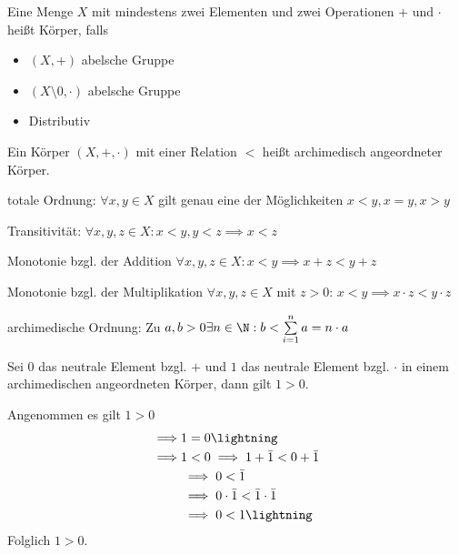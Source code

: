 \begin{definition}
	Eine Menge $X$ mit mindestens zwei Elementen und zwei Operationen $+$ und $\cdot$ heißt Körper, falls \begin{itemize}
		\item $(X,+)$ abelsche Gruppe
		\item $(X\setminus 0, \cdot)$ abelsche Gruppe
		\item Distributiv
	\end{itemize}
\end{definition}
\begin{definition}
	Ein Körper $(X,+,\cdot)$ mit einer Relation $<$ heißt archimedisch angeordneter Körper.\begin{enumerateroman}
		\item totale Ordnung: $\forall x,y \in X$ gilt genau eine der Möglichkeiten
		$x<y,x=y,x>y$
		\item Transitivität: $\forall x,y,z \in X: x<y,y<z\implies x<z$
		\item Monotonie bzgl. der Addition $\forall x,y,z \in X: x <y\implies x+z< y+z$
		\item Monotonie bzgl. der Multiplikation $\forall x,y,z \in X$ mit $z>0$:
		$x<y\implies x\cdot z<y\cdot z$
		\item archimedische Ordnung: Zu $a,b > 0 \exists n \in \N: b<\sum\limits_{i=1}^{n}a=n\cdot a$
	\end{enumerateroman}
\end{definition}
\begin{theorem}
	Sei $0$ das neutrale Element bzgl. $+$ und $1$ das neutrale Element bzgl. $\cdot$ in einem archimedischen angeordneten Körper, dann gilt $1>0$.
\end{theorem}
\prove
Angenommen es gilt $1>0$
\begin{align*}
	\implies & 1=0\text{\lightning}                         \\
	\implies & 1<0\implies 1+\bar{1}<0+\bar{1}              \\
	         & \implies 0<\bar{1}                           \\
	         & \implies 0\cdot \bar{1}< \bar{1}\cdot\bar{1} \\
	         & \implies 0 < 1\text{\lightning}
\end{align*}
Folglich $1>0$.\\
